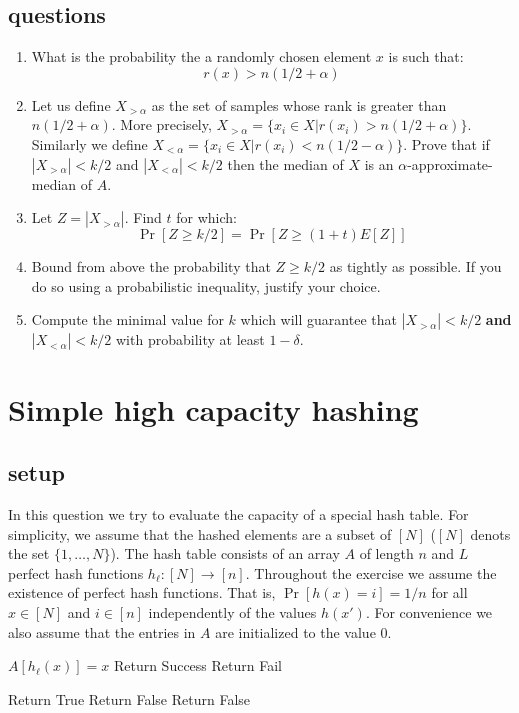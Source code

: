 \documentclass{article}
\begin{document}
\subsection*{questions}
\begin{enumerate}
\item What is the probability the a randomly chosen element $x$ is
such that:
\[
r(x) > n(1/2 + \alpha)
\]
\item Let us define $X_{>\alpha}$ as the set of samples whose rank
is greater than $n(1/2 + \alpha)$. More precisely, $X_{>\alpha} =
\{x_i \in X | r(x_i) > n(1/2 + \alpha)\}$. Similarly we define
$X_{<\alpha} = \{x_i \in X | r(x_i) < n(1/2 - \alpha)\}$. Prove that
if $|X_{>\alpha}| < k/2$ and $|X_{<\alpha}| < k/2$ then the median
of $X$ is an $\alpha$-approximate-median of $A$.
\item Let $Z = |X_{>\alpha}|$. Find $t$ for which:
\[
\Pr[Z \ge k/2] = \Pr[Z \ge (1+t)E[Z]]
\]
\item Bound from above the probability that $Z \ge k/2$ as tightly
as possible. If you do so using a probabilistic inequality, justify
your choice.
\item Compute the minimal value for $k$ which will guarantee that
$|X_{>\alpha}| < k/2$ {\bf and} $|X_{<\alpha}| < k/2$ with
probability at least $1-\delta$.
\end{enumerate}
\pagebreak


\section{Simple high capacity hashing}
\subsection*{setup}
In this question we try to evaluate the capacity of a special hash table.
For simplicity, we assume that the hashed elements are a subset of $[N]$ ($[N]$ denots the set $\{1,\dots,N\}$).
The hash table consists of an array $A$ of length $n$ and $L$ perfect hash functions $h_\ell: [N] \rightarrow [n]$.
Throughout the exercise we assume the existence of perfect hash functions. That is, $\Pr[h(x) = i] = 1/n$ for all $x \in [N]$ and $i\in [n]$ 
independently of the values $h(x')$.  For convenience we also assume that the entries in $A$ are initialized to the value $0$.
%
\begin{algorithm}
\caption{$Add(x)$}
\begin{algorithmic}
\FOR {$\ell \in [L]$}
    	\STATE $A[h_\ell(x)] = x$
	\STATE Return Success
    \ENDIF
\ENDFOR
\STATE Return Fail
\end{algorithmic}
\end{algorithm}
%
\vspace{-.6cm}
\begin{algorithm}
\caption{$Query(x)$}
\begin{algorithmic}
\FOR {$\ell \in [L]$}
	\STATE Return True
   	\STATE Return False
    \ENDIF
\ENDFOR
\STATE Return False
\end{algorithmic}
\end{algorithm}
%
\vspace{-.6cm}
\end{document}
